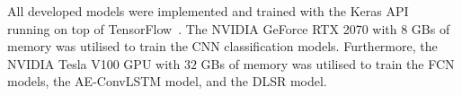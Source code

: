 All developed models were implemented and trained with the Keras API~\cite{chollet2015keras} running on top of TensorFlow~\cite{Abadi2016}.
The NVIDIA GeForce RTX 2070 with \(8\) GBs of memory was utilised to train the CNN classification models.
Furthermore, the NVIDIA Tesla V100 GPU with \(32\) GBs of memory was utilised to train the FCN models, the AE-ConvLSTM model, and the DLSR model.







